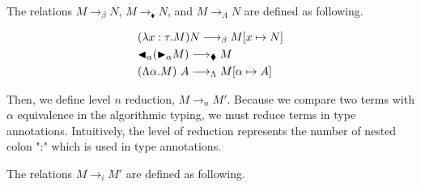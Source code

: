 \begin{definition}
    The relations $M \longrightarrow_\beta N$, $M \longrightarrow_\blacklozenge N$, and $M \longrightarrow_\Lambda N$ are defined as following.
\begin{center}
  \begin{align*}
     & (\lambda x:\tau.M) N \longrightarrow_\beta M[x \mapsto N]         \\
     & {\mathop{\blacktriangleleft}}_\alpha ({\mathop{\blacktriangleright}}_\alpha M)\longrightarrow_\blacklozenge M         \\
     & (\Lambda \alpha.M)\ A \longrightarrow_\Lambda M[\alpha \mapsto A]
  \end{align*}
\end{center}
\end{definition}

Then, we define level \( n \) reduction, \( M \longrightarrow_n M' \). Because
we compare two terms with \( \alpha \) equivalence in the algorithmic typing,
we must reduce terms in type annotations.  Intuitively, the level of reduction
represents the number of nested colon ":" which is used in type annotations. 

\begin{definition}
    The relations \( M \longrightarrow_i M' \) are defined as following.
    \begin{center}
         \\[2mm]
         \hfil
         \hfil
         \hfil
         \hfil
         \\[2mm]
         \hfil
         \hfil
         \hfil
         \\[2mm]
         \hfil
         \hfil
         \hfil
         \hfil
    \end{center}
\end{definition}

